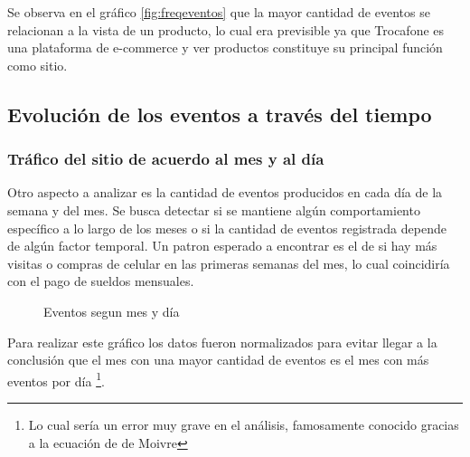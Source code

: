 \documentclass[a4paper]{article}
\begin{document}
Se observa en el gráfico \ref{fig:freqeventos} que la mayor cantidad de eventos se relacionan a la vista de un producto, lo cual era previsible ya que Trocafone es una plataforma de e-commerce y ver productos constituye su principal función como sitio.

\subsection{Evolución de los eventos a través del tiempo}

\subsubsection{Tráfico del sitio de acuerdo al mes y al día}

Otro aspecto a analizar es la cantidad de eventos producidos en cada día de la semana y del mes. Se busca detectar si se mantiene algún comportamiento específico a lo largo de los meses o si la cantidad de eventos registrada depende de algún factor temporal. Un patron esperado a encontrar es el de si hay más visitas o compras de celular en las primeras semanas del mes, lo cual coincidiría con el pago de sueldos mensuales.

\begin{figure}[h!]
	\caption{Eventos segun mes y día}
	\label{fig:mesdiasnormalizado}
\end{figure}

Para realizar este gráfico los datos fueron normalizados para evitar llegar a la conclusión que el mes con una mayor cantidad de eventos es el mes con más eventos por día \footnote{Lo cual sería un error muy grave en el análisis, famosamente conocido gracias a la ecuación de de Moivre}. 
\end{document}
